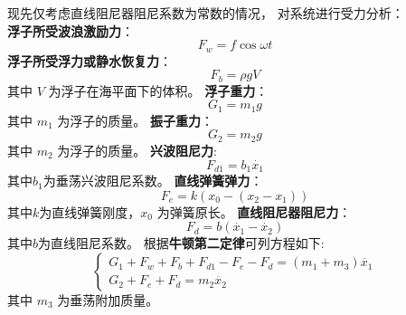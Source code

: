 \documentclass[withoutpreface,bwprint]{cumcmthesis} %
\begin{document}
    现先仅考虑直线阻尼器阻尼系数为常数的情况，
    对系统进行受力分析：\\
    \textbf{浮子所受波浪激励力}： 
    \begin{equation}
        F_w = f \cos\omega t 
        \label{eq:wave}
    \end{equation}
    \textbf{浮子所受浮力或静水恢复力}：
    \begin{equation}
        F_b = \rho g V 
        \label{eq:buoyancy}
    \end{equation}其中 $V$ 为浮子在海平面下的体积。
    \textbf{浮子重力}：
    \begin{equation}
        G_1 = m_1 g
        \label{eq:G1}
    \end{equation} 其中 $m_1$ 为浮子的质量。
    \textbf{振子重力}：
    \begin{equation}
        G_2 = m_2 g
        \label{eq:G2}
    \end{equation} 其中 $m_2$ 为浮子的质量。
    \textbf{兴波阻尼力}: 
    \begin{equation}
        F_{d1} = b_1\dot{x_1}
        \label{eq:d1}
    \end{equation} 其中$b_1$为垂荡兴波阻尼系数。
    \textbf{直线弹簧弹力}： 
    \begin{equation}
        F_e = k(x_0 - (x_2 - x_1))
        \label{eq:e}
    \end{equation} 其中$k$为直线弹簧刚度，$x_0$ 为弹簧原长。
    \textbf{直线阻尼器阻尼力}：
    \begin{equation}
        F_d = b(\dot{x_1} - \dot{x_2})
        \label{eq:d}
    \end{equation} 其中$b$为直线阻尼系数。
    根据\textbf{牛顿第二定律}可列方程如下:
    \begin{equation}
        \begin{cases}
            G_1 + F_w + F_b + F_{d1} - F_e - F_d = (m_1 + m_3) \ddot{x_1}\\
            G_2 + F_e + F_d = m_2 \ddot{x_2}
        \end{cases}
        \label{eq:newton}
    \end{equation}
    其中 $m_3$ 为垂荡附加质量。
\end{document}
